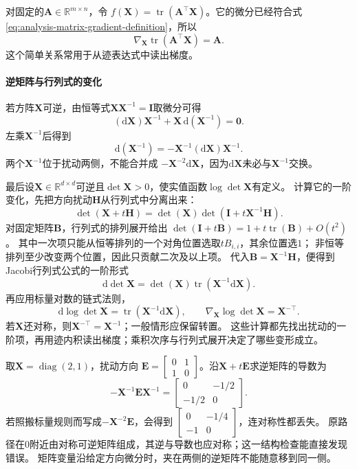 对固定的$\bm{A}\in\mathbb{R}^{m\times n}$，令 $f(\bm{X})=\operatorname{tr}(\bm{A}^{\top}\bm{X})$。它的微分已经符合式
\eqref{eq:analysis-matrix-gradient-definition}，所以
\begin{equation}
  \nabla_{\bm{X}}\operatorname{tr}(\bm{A}^{\top}\bm{X})
  =\bm{A}.
\label{eq:analysis-trace-linear-gradient}
\end{equation}
这个简单关系常用于从迹表达式中读出梯度。

\paragraph{逆矩阵与行列式的变化}

若方阵$\bm{X}$可逆，由恒等式$\bm{X}\bm{X}^{-1}=\bm{I}$取微分可得
\[   (\mathrm{d}\bm{X})\bm{X}^{-1}   +\bm{X}\,\mathrm{d}(\bm{X}^{-1})=\bm{0}. \]
左乘$\bm{X}^{-1}$后得到
\begin{equation}
  \mathrm{d}(\bm{X}^{-1})
  =
  -\bm{X}^{-1}(\mathrm{d}\bm{X})\bm{X}^{-1}.
\label{eq:analysis-inverse-differential}
\end{equation}
两个$\bm{X}^{-1}$位于扰动两侧，不能合并成 $-\bm{X}^{-2}\mathrm{d}\bm{X}$，因为$\mathrm{d}\bm{X}$未必与$\bm{X}^{-1}$交换。

最后设$\bm{X}\in\mathbb{R}^{d\times d}$可逆且$\det\bm{X}>0$，使实值函数$\log\det\bm{X}$有定义。
计算它的一阶变化，先把方向扰动$\bm H$从行列式中分离出来：
\[
 \det(\bm X+t\bm H)=\det(\bm X)\det(\bm I+t\bm X^{-1}\bm H).
\]
对固定矩阵$\bm B$，行列式的排列展开给出
$\det(\bm I+t\bm B)=1+t\operatorname{tr}(\bm B)+O(t^2)$。
其中一次项只能从恒等排列的一个对角位置选取$tB_{i,i}$，其余位置选$1$；
非恒等排列至少改变两个位置，因此只贡献二次及以上项。
代入$\bm B=\bm X^{-1}\bm H$，便得到Jacobi行列式公式的一阶形式
\[   \mathrm{d}\det\bm{X}   =   \det(\bm{X})\operatorname{tr}   (\bm{X}^{-1}\mathrm{d}\bm{X}). \]
再应用标量对数的链式法则，
\begin{equation}
  \mathrm{d}\log\det\bm{X}
  =
  \operatorname{tr}(\bm{X}^{-1}\mathrm{d}\bm{X}),
  \qquad
  \nabla_{\bm{X}}\log\det\bm{X}
  =
  \bm{X}^{-\top}.
\label{eq:analysis-logdet-gradient}
\end{equation}
若$\bm X$还对称，则$\bm{X}^{-\top}=\bm{X}^{-1}$；一般情形应保留转置。
这些计算都先找出扰动的一阶项，再用迹内积读出梯度；乘积次序与行列式展开决定了哪些变形成立。
\begin{example}[逆矩阵微分中的乘法次序]
\label{ex:analysis-noncommuting-inverse-differential}
取$\bm X=\operatorname{diag}(2,1)$，扰动方向
$\bm E=\begin{bmatrix}0&1\\1&0\end{bmatrix}$。沿$\bm X+t\bm E$求逆矩阵的导数为
\[
 -\bm X^{-1}\bm E\bm X^{-1}
 =\begin{bmatrix}0&-1/2\\-1/2&0\end{bmatrix}.
\]
若照搬标量规则而写成$-\bm X^{-2}\bm E$，会得到
$\begin{bmatrix}0&-1/4\\-1&0\end{bmatrix}$，连对称性都丢失。
原路径在$0$附近由对称可逆矩阵组成，其逆与导数也应对称；这一结构检查能直接发现错误。
矩阵变量沿给定方向微分时，夹在两侧的逆矩阵不能随意移到同一侧。
\end{example}

